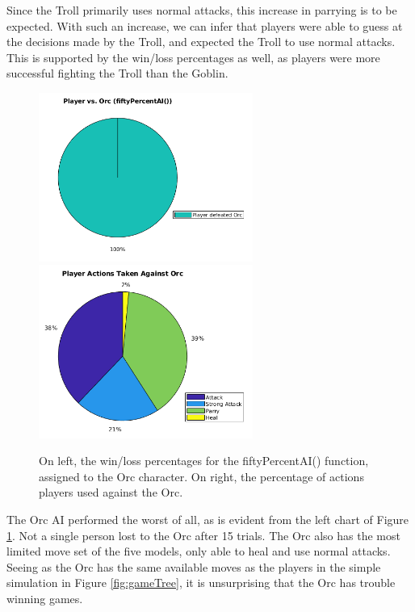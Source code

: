 Since the Troll primarily uses normal attacks, this increase in parrying is to be expected. With such an increase, we can infer that players were able to guess at the decisions made by the Troll, and expected the Troll to use normal attacks. This is supported by the win/loss percentages as well, as players were more successful fighting the Troll than the Goblin.

\begin{figure}[H]
  \centering
  \includegraphics[width=7cm]{figures/orcWins.png}
  \includegraphics[width=7cm]{figures/actionsOrc.png}
  \caption{On left, the win/loss percentages for the fiftyPercentAI() function, assigned to the Orc character. On right, the percentage of actions players used against the Orc.}
  \label{fig:pieOrc}
\end{figure}

The Orc AI performed the worst of all, as is evident from the left chart of Figure \ref{fig:pieOrc}. Not a single person lost to the Orc after 15 trials. The Orc also has the most limited move set of the five models, only able to heal and use normal attacks. Seeing as the Orc has the same available moves as the players in the simple simulation in Figure \ref{fig:gameTree}, it is unsurprising that the Orc has trouble winning games.\\

